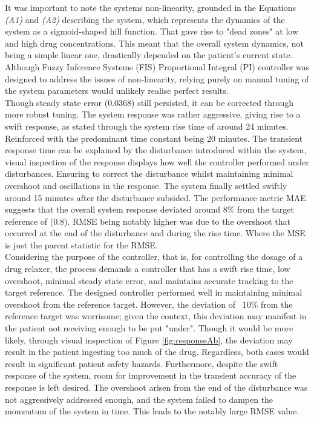\documentclass[12pt]{article}
\begin{document}
It was important to note the systems non-linearity, grounded in the Equations \textit{(A1)} and \textit{(A2)} describing the system, which represents the dynamics of the system as a sigmoid-shaped hill function.
That gave rise to "dead zones" at low and high drug concentrations.
This meant that the overall system dynamics, not being a simple linear one, drastically depended on the patient's current state.
Although Fuzzy Inference Systems (FIS) Proportional Integral (PI) controller was designed to address the issues of non-linearity, relying purely on manual tuning of the system parameters would unlikely realise perfect results.
\\

Though steady state error (0.0368) still persisted, it can be corrected through more robust tuning.
The system response was rather aggressive, giving rise to a swift response, as stated through the system rise time of around 24 minutes. 
Reinforced with the predominant time constant being 20 minutes. 
The transient response time can be explained by the disturbance introduced within the system, visual inspection of the response displays how well the controller performed under disturbances.
Ensuring to correct the disturbance whilst maintaining minimal overshoot and oscillations in the response. 
The system finally settled swiftly around 15 minutes after the disturbance subsided.
The performance metric MAE suggests that the overall system response deviated around 8\% from the target reference of (0.8).
RMSE being notably higher was due to the overshoot that occurred at the end of the disturbance and during the rise time.
Where the MSE is just the parent statistic for the RMSE.
\\

Considering the purpose of the controller, that is, for controlling the dosage of a drug relaxer, the process demands a controller that has a swift rise time, low overshoot, minimal steady state error, and maintains accurate tracking to the target reference. 
The designed controller performed well in maintaining minimal overshoot from the reference target.
However, the deviation of ~10\% from the reference target was worrisome; given the context, this deviation may manifest in the patient not receiving enough to be put "under".
Though it would be more likely, through visual inspection of Figure \ref{fig:responseAb}, the deviation may result in the patient ingesting too much of the drug.
Regardless, both cases would result in significant patient safety hazards.
Furthermore, despite the swift response of the system, room for improvement in the transient accuracy of the response is left desired.
The overshoot arisen from the end of the disturbance was not aggressively addressed enough, and the system failed to dampen the momentum of the system in time.
This leads to the notably large RMSE value.
\\
\end{document}
